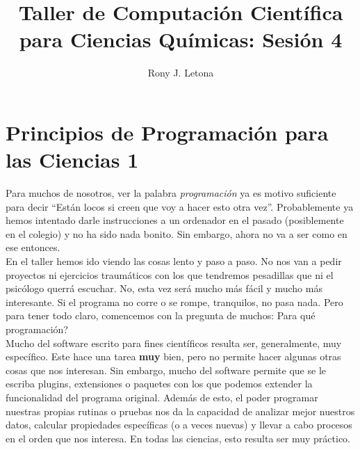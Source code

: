 \documentclass[10pt,letterpaper]{article}
\author{Rony J. Letona}
\title{Taller de Computaci\'on Cient\'ifica para Ciencias Qu\'imicas: Sesi\'on 4}
\begin{document}
\maketitle

\section{Principios de Programaci\'on para las Ciencias 1}
Para muchos de nosotros, ver la palabra \emph{programaci\'on} ya es motivo suficiente para decir ``Est\'an locos si creen que voy a hacer esto otra vez''. Probablemente ya hemos intentado darle instrucciones a un ordenador en el pasado (posiblemente en el colegio) y no ha sido nada bonito. Sin embargo, ahora no va a ser como en ese entonces.\\

En el taller hemos ido viendo las cosas lento y paso a paso. No nos van a pedir proyectos ni ejercicios traum\'aticos con los que tendremos pesadillas que ni el psic\'ologo querr\'a escuchar. No, esta vez ser\'a mucho m\'as f\'acil y mucho m\'as interesante. Si el programa no corre o se rompe, tranquilos, no pasa nada. Pero para tener todo claro, comencemos con la pregunta de muchos: Para qu\'e programaci\'on?\\

Mucho del software escrito para fines cient\'ificos resulta ser, generalmente, muy espec\'ifico. Este hace una tarea \textbf{muy} bien, pero no permite hacer algunas otras cosas que nos interesan. Sin embargo, mucho del software permite que se le escriba plugins, extensiones o paquetes con los que podemos extender la funcionalidad del programa original. Adem\'as de esto, el poder programar nuestras propias rutinas o pruebas nos da la capacidad de analizar mejor nuestros datos, calcular propiedades espec\'ificas (o a veces nuevas) y llevar a cabo procesos en el orden que nos interesa. En todas las ciencias, esto resulta ser muy pr\'actico.\\
\end{document}

